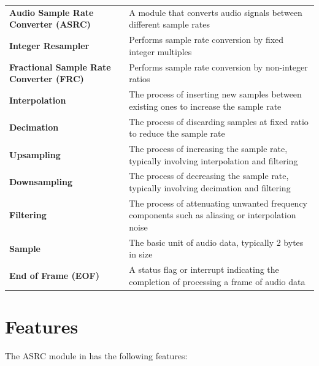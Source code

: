 \documentclass[main\_\_EN.tex]{subfiles}
\begin{document}
\begin{longtable}[c]{R{6cm} p{{10cm}}}
\textbf{Audio Sample Rate Converter (ASRC)} & A module that converts audio signals between different sample rates \\
\textbf{Integer Resampler} & Performs sample rate conversion by fixed integer multiples \\
\textbf{Fractional Sample Rate Converter (FRC)}& Performs sample rate conversion by non-integer ratios \\
\textbf{Interpolation} & The process of inserting new samples between existing ones to increase the sample rate \\
\textbf{Decimation} & The process of discarding samples at fixed ratio to reduce the sample rate \\
\textbf{Upsampling} & The process of increasing the sample rate, typically involving interpolation and filtering \\
\textbf{Downsampling} & The process of decreasing the sample rate, typically involving decimation and filtering \\
\textbf{Filtering} & The process of attenuating unwanted frequency components such as aliasing or interpolation noise \\
\textbf{Sample}& The basic unit of audio data, typically 2 bytes in size  \\
\textbf{End of Frame (EOF)} & A status flag or interrupt indicating the completion of processing a frame of audio data \\
\end{longtable}


\section{Features}
\label{sec:asrc-features}

The ASRC module in \chipname{} has the following features:
\end{document}
